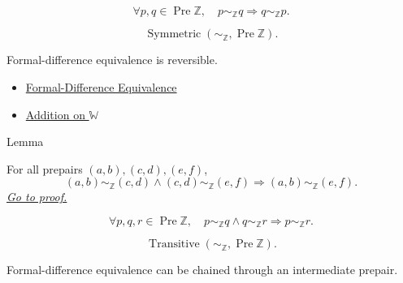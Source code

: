 \begin{remark*}
\[
\forall p,q\in\operatorname{Pre}\mathbb{Z},\quad
p\sim_{\mathbb{Z}}q \Longrightarrow q\sim_{\mathbb{Z}}p.
\]
\end{remark*}

\begin{remark*}
\[
\operatorname{Symmetric}(\sim_{\mathbb{Z}},\operatorname{Pre}\mathbb{Z}).
\]
\end{remark*}

\begin{remark*}[Interpretation]
Formal-difference equivalence is reversible.
\end{remark*}

\begin{dependencies}
\begin{itemize}
  \item \hyperref[def:formal-difference-equivalence]{Formal-Difference Equivalence}
  \item \hyperref[def:addition-on-w]{Addition on $\mathbb{W}$}
\end{itemize}
\end{dependencies}

\begin{lemmabox}{Lemma}
\begin{lemma}
\label{lem:formal-difference-equivalence-transitive}
For all prepairs $(a,b),(c,d),(e,f)$,
\[
(a,b)\sim_{\mathbb{Z}}(c,d)\land
(c,d)\sim_{\mathbb{Z}}(e,f)
\Longrightarrow
(a,b)\sim_{\mathbb{Z}}(e,f).
\]
\hyperref[prf:formal-difference-equivalence-transitive]{\textit{Go to proof.}}
\end{lemma}
\end{lemmabox}

\begin{remark*}
\[
\forall p,q,r\in\operatorname{Pre}\mathbb{Z},\quad
p\sim_{\mathbb{Z}}q\land q\sim_{\mathbb{Z}}r
\Longrightarrow
p\sim_{\mathbb{Z}}r.
\]
\end{remark*}

\begin{remark*}
\[
\operatorname{Transitive}(\sim_{\mathbb{Z}},\operatorname{Pre}\mathbb{Z}).
\]
\end{remark*}

\begin{remark*}[Interpretation]
Formal-difference equivalence can be chained through an intermediate prepair.
\end{remark*}

